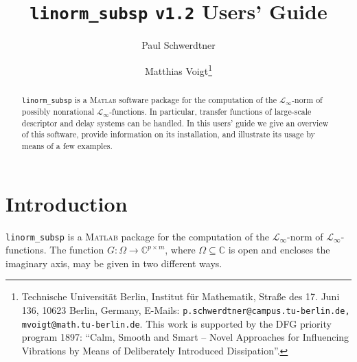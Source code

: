 \documentclass[10pt,a4paper]{article}
\author{Paul Schwerdtner \and Matthias Voigt\thanks{Technische Universit\"at Berlin, Institut f\"ur Mathematik, Stra{\ss}e des 17. Juni 136, 10623 Berlin, Germany, \newline E-Mails: \texttt{p.schwerdtner@campus.tu-berlin.de, mvoigt@math.tu-berlin.de}. \newline This work is supported by the DFG priority program 1897: ``Calm, Smooth and Smart -- Novel Approaches for Influencing Vibrations by Means of Deliberately Introduced Dissipation''.}}
\title{\texttt{linorm\_subsp} \texttt{v1.2} Users' Guide}
\begin{document}
\maketitle
\begin{abstract}
\texttt{linorm\_subsp} is a \textsc{Matlab} software package for the computation of the $\mathcal{L}_\infty$-norm of possibly nonrational $\mathcal{L}_\infty$-functions. In particular, transfer functions of large-scale descriptor and delay systems can be handled. In this users' guide we give an overview of this software, provide information on its installation, and illustrate its usage by means of a few examples.
\end{abstract}

\section{Introduction}
\texttt{linorm\_subsp} is a \textsc{Matlab} package for the computation of the $\mathcal{L}_\infty$-norm of $\mathcal{L}_\infty$-functions. The function $G: \Omega  \rightarrow \mathbb{C}^{p \times m}$, where $\Omega \subseteq \mathbb{C}$ is open and encloses the imaginary axis, may be given in two different ways.
\end{document}
